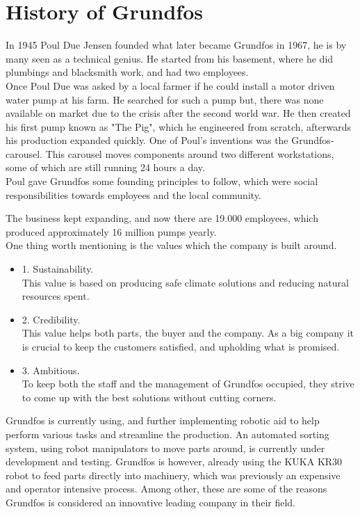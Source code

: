 \section{History of Grundfos} \label{ch:History of Grundfos}

In 1945 Poul Due Jensen founded what later became Grundfos in 1967, he is by many seen as a technical genius. He started from his basement, where he did plumbings and blacksmith work, and had two employees.\\

Once Poul Due was asked by a local farmer if he could install a motor driven water pump at his farm. He searched for such a pump but, there was none available on market due to the crisis after the second world war. 
He then created his first pump known as "The Pig", which he engineered from scratch, afterwards his production expanded quickly. 
One of Poul's inventions was the Grundfos-carousel. This carousel moves components around two different workstations, some of which are still running 24 hours a day.\\

Poul gave Grundfos some founding principles to follow, which were social responsibilities towards employees and the local community.

The business kept expanding, and now there are 19.000 employees, which produced approximately 16 million pumps yearly.\\

One thing worth mentioning is the values which the company is built around.\\

\begin{itemize}
   
\item 1. Sustainability.\\ This value is based on producing safe climate solutions and reducing natural resources spent.\\
\item 2. Credibility.\\ This value helps both parts, the buyer and the company. As a big company it is crucial to keep the customers satisfied, and upholding what is promised.\\
\item 3. Ambitious.\\ To keep both the staff and the management of Grundfos occupied, they strive to come up with the best solutions without cutting corners.\\
\end{itemize}
Grundfos is currently using, and further implementing robotic aid to help perform various tasks and streamline the production. An automated sorting system, using robot manipulators to move parts around, is currently under development and testing. Grundfos is however, already using the KUKA KR30 robot to feed parts directly into machinery, which was previously an expensive and operator intensive process. Among other, these are some of the reasons Grundfos is considered an innovative leading company in their field\cite{1Grundfos}. 

